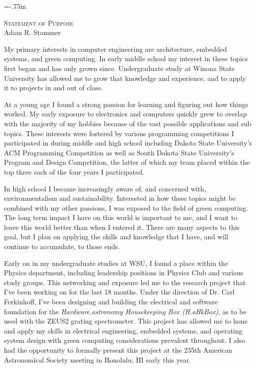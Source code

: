 \setlength{\oddsidemargin}{0in}
\setlength{\evensidemargin}{0in}
\setlength{\textwidth}{6.5in}
\setlength{\topmargin}{-.3in}
\setlength{\textheight}{11in}
\pagestyle{empty}



\newcommand{\university}{University of Minnesota }
\newcommand{\uni}{UMN }

\topmargin=-.75in



\begin{center}
{\Large \huge \scshape Statement of Purpose} \\[.3in]
{\large Adam R. Stammer}
\end{center}

\vspace*{.1in}

My primary interests in computer engineering are architecture, embedded systems,
and green computing. In early middle school my interest in these topics first began and
has only grown since. Undergraduate study at Winona State University
has allowed me to grow that knowledge and experience, and to apply it to projects in and out of class.

At a young age I found a strong passion for learning and figuring out how things worked. My
early exposure to electronics and computers quickly grew to overlap with the majority of my
hobbies because of the vast possible applications and sub topics. These interests were
fostered by various programming competitions I participated in during middle and high school including 
Dakota State University's ACM Programming Competition as well as South Dakota State University's Program
and Design Competition, the latter of which my team placed within the top three each of the four years I
participated.

In high school I became increasingly aware of, and concerned with, environmentalism and sustainability.
Interested in how these topics might be combined with my other passions, I was exposed to the field
of green computing. The long term impact I have on this world is important to me, and I want to leave
this world better than when I entered it. There are many aspects to this goal, but I plan on applying the 
skills and knowledge that I have, and will continue to accumulate, to those ends. 

Early on in my undergraduate studies at WSU, I found a place within the Physics department, including 
leadership positions in Physics Club and various study groups. This networking and exposure led me to
the research project that I've been working on for the last 18 months. Under the direction of Dr. Carl
Ferkinhoff, I've been designing and building the electrical and software foundation for the \emph{Hardware.astronomy 
Housekeeping Box (H.aHkBox)}, as to be used with the ZEUS2 grating spectrometer. This project has allowed
me to hone and apply my skills in electrical engineering, embedded systems, and operating system design
with green computing considerations prevalent throughout. I also had the opportunity to formally present
this project at the 235th American Astronomical Society meeting in Honolulu, HI early this year.

